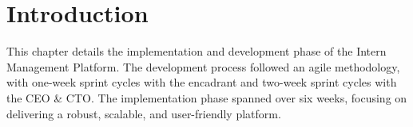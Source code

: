 \section{Introduction}
\noindent
This chapter details the implementation and development phase of the Intern Management Platform. The development process followed an agile methodology, with one-week sprint cycles with the encadrant and two-week sprint cycles with the CEO \& CTO. The implementation phase spanned over six weeks, focusing on delivering a robust, scalable, and user-friendly platform.

